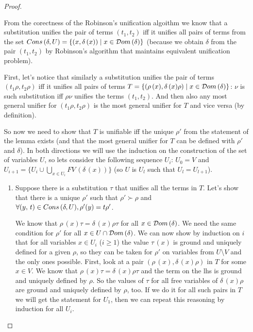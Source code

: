 \begin{proof} $ $

From the corectness of the Robinson's unification algoithm we know that a substitution unifies the pair of terms $(t_1, t_2)$ iff it unifies all pairs of terms from the set $Cons\,(\delta, U) = \{ (x, \delta\,(x)) \mid x \in \mathcal{D}om\,(\delta) \}$ (because we obtain $\delta$ from the pair $(t_1, t_2)$ by Robinson's algorithm that maintains equivalent unification problem).

First, let's notice that similarly a substitution unifies the pair of terms $(t_1 \rho, t_2 \rho)$ iff it unifies all pairs of terms  $T = \{ (\rho\,(x), \delta\,(x) \rho) \mid x \in \mathcal{D}om\,(\delta) \}$: $\nu$ is such substitution iff $\rho \nu$ unifies the terms $(t_1, t_2)$. And then also any most general unifier for $(t_1 \rho, t_2 \rho)$ is the most general unifier for $T$ and vice versa (by definition).

So now we need to show that $T$ is unifiable iff the unique $\rho'$ from the statement of the lemma exists (and that the most general unifier for $T$ can be defined with $\rho'$ and $\delta$). In both directions we will use the induction on the construction of the set of variables $U$, so lets consider the following sequence $U_i$: $U_0 = V$ and $U_{i+1} = \{ U_i \cup \bigcup\limits_{x \in U_{i}} FV\,(\delta\,(x)) \}$ (so $U$ is $U_l$ such that $U_l = U_{l + 1}$).

\begin{enumerate}
\item Suppose there is a substitution $\tau$ that unifies all the terms in $T$. Let's show that there is a unique $\rho'$ such that $\rho' \succ \rho$ and $\forall (y, \, t) \in Cons\,(\delta, U), \\ \rho'(y) = t \rho'$.

We know that $\rho\,(x) \tau = \delta\,(x) \rho \tau$ for all $x \in \mathcal{D}om\,(\delta)$. We need the same condition for $\rho'$ for all $x \in U \cap \mathcal{D}om\,(\delta)$. We can now show by induction on $i$ that for all variables $x \in U_i$ ($i \ge 1$) the value $\tau\,(x)$ is ground and uniquely defined for a given $\rho$, so they can be taken for $\rho'$ on variables from $U \setminus V$ and the only ones possible. First, look at a pair $(\rho\,(x), \delta\,(x) \rho)$ in $T$ for some $x \in V$. We know that $\rho\,(x) \tau = \delta\,(x) \rho \tau$ and the term on the lhs is ground and uniquely defined by $\rho$. So the values of $\tau$ for all free variables of $\delta\,(x) \rho$ are ground and uniquely defined by $\rho$, too. If we do it for all such pairs in $T$ we will get the statement for $U_1$, then we can repeat this reasoning by induction for all $U_i$.


\end{enumerate}
\end{proof}
